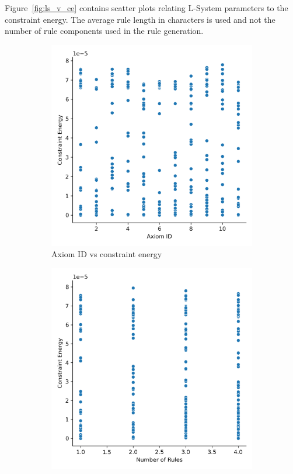 Figure~\ref{fig:ls_v_ce} contains scatter plots relating L-System parameters to the constraint energy. The average rule length in characters is used and not the number of rule components used in the rule generation.

\begin{figure}[H]
	\centering
	\begin{subfigure}[c]{0.45\textwidth}
		\centering
		\includegraphics[width=\textwidth]{aid_vs_ce.png}
		\caption{Axiom ID vs constraint energy}
	\end{subfigure}
	\hfill
	\begin{subfigure}[c]{0.45\textwidth}
		\centering
		\includegraphics[width=\textwidth]{nor_vs_ce.png}

\end{subfigure}
\end{figure}
